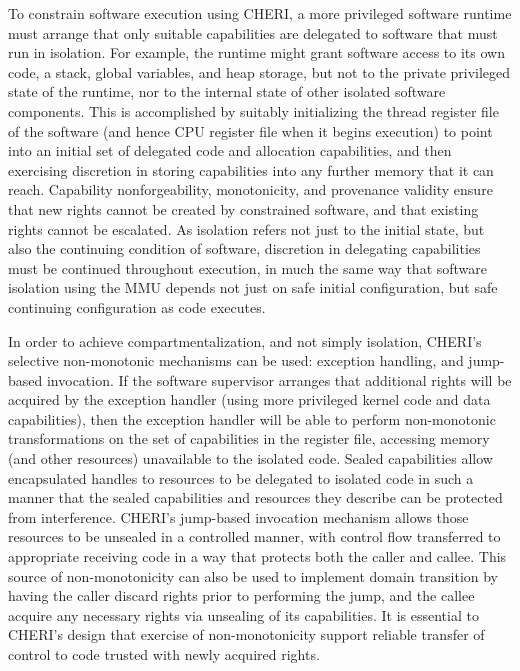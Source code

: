 To constrain software execution using CHERI, a more privileged software
runtime must arrange that only suitable capabilities are delegated to software
that must run in isolation.
For example, the runtime might grant software access to its own code, a stack,
global variables, and heap storage, but not to the private privileged state of
the runtime, nor to the internal state of other isolated software components.
This is accomplished by suitably initializing the thread register file of the
software (and hence CPU register file when it begins execution) to point into
an initial set of delegated code and allocation capabilities, and then
exercising discretion in storing capabilities into any further memory that it
can reach.
Capability nonforgeability, monotonicity, and provenance validity ensure
that new rights cannot be created by constrained software, and that existing
rights cannot be escalated.
As isolation refers not just to the initial state, but also the continuing
condition of software, discretion in delegating capabilities must be continued
throughout execution, in much the same way that software isolation using the
MMU depends not just on safe initial configuration, but safe continuing
configuration as code executes.

In order to achieve compartmentalization, and not simply isolation, CHERI's
selective non-monotonic mechanisms can be used: exception handling, and
jump-based invocation.
If the software supervisor arranges that additional rights will be acquired by
the exception handler (using more privileged kernel code and data
capabilities), then the exception handler will be able to perform
non-monotonic transformations on the set of capabilities in the register file,
accessing memory (and other resources) unavailable to the isolated code.
Sealed capabilities allow encapsulated handles to resources to be delegated to
isolated code in such a manner that the sealed capabilities and resources they
describe can be protected from interference.
CHERI's jump-based invocation mechanism allows those resources to be unsealed
in a controlled manner, with control flow transferred to appropriate receiving
code in a way that protects both the caller and callee.
This source of non-monotonicity can also be used to implement domain
transition by having the caller discard rights prior to performing the jump,
and the callee acquire any necessary rights via unsealing of its capabilities.
It is essential to CHERI's design that exercise of non-monotonicity support
reliable transfer of control to code trusted with newly acquired rights.

